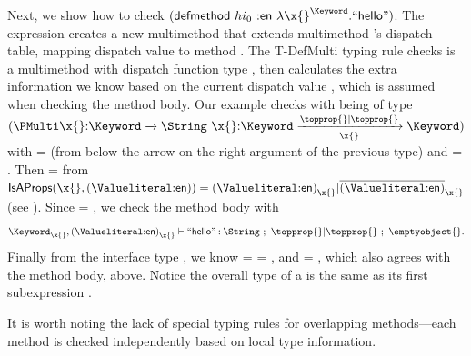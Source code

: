 Next, we show how to check
$
{\extendmultiexp {hi_0} {\makekw{en}} {\abs {\x{}} {\Keyword} {\makestr{hello}}}}
$.
%
The expression 
{ {} {}} creates a new multimethod
that extends multimethod 's dispatch table, mapping dispatch value
 to method . The T-DefMulti typing rule
checks  is a multimethod with dispatch function type ,
then calculates the extra information we know based on the current
dispatch value {\thenprop{\proppp{}}}, which is assumed when checking the method
body.
Our example checks with  being of type
$
{\MultiFntype {\ArrowTwo{\x{}}{\Keyword}{\String}}
              {\ArrowOne{\x{}}{\Keyword}{\Keyword}{\filterset{\topprop{}}{\topprop{}}}{\x{}}}}
$
with \objectp{} = {\x{}} (from below the arrow on the right argument of the previous type) and  = . 
Then {\thenprop{\proppp{}}} = 
{}
from
$
\isacompare{}{\x{}}{\Value{\makekw{en}}}
{\filterset {\isprop {\Value{\makekw{en}}}{\x{}}}{\notprop{\Value{\makekw{en}}}{\x{}}}}
$
(see ).
Since \ty{} = \Keyword{}, we check the method body with
$$
\judgement{{\isprop{\Keyword}{\x{}}},{\isprop {\Value{\makekw{en}}}{\x{}}}}
  {\makestr{hello}}
  {\String}{\filterset{\topprop{}}{\topprop{}}}{\emptyobject{}}\text{.}
$$
Finally from the interface type , we know \thenprop{\prop{}} = \elseprop{\prop{}} = \topprop{},
and \object{} = \emptyobject{}, which also agrees with the method body, above.
Notice the overall type of a  is the same as its first subexpression .

It is worth noting the lack of special typing rules for overlapping methods---each
method is checked independently based on local type information.

